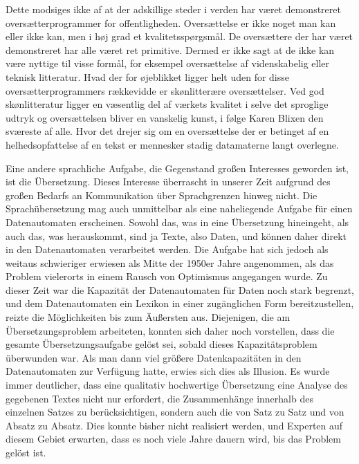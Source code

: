 {Dette modsiges ikke af at der adskillige steder i verden har været demonstreret oversætterprogrammer for offentligheden. Oversættelse er ikke noget man kan eller ikke kan, men i høj grad et kvalitetsspørgsmål. De oversættere der har været demonstreret har alle været ret primitive. Dermed er ikke sagt at de ikke kan være nyttige til visse formål, for eksempel oversættelse af videnskabelig eller teknisk litteratur. Hvad der for øjeblikket ligger helt uden for disse oversætterprogrammers rækkevidde er skønlitterære oversættelser. Ved god skønlitteratur ligger en væsentlig del af værkets kvalitet i selve det sproglige udtryk og oversættelsen bliver en vanskelig kunst, i følge Karen Blixen den sværeste af alle. Hvor det drejer sig om en oversættelse der er betinget af en helhedsopfattelse af en tekst er mennesker stadig datamaterne langt overlegne. 
}{
Eine andere sprachliche Aufgabe, die Gegenstand großen Interesses geworden ist, ist die Übersetzung. Dieses Interesse überrascht in unserer Zeit aufgrund des großen Bedarfs an Kommunikation über Sprachgrenzen hinweg nicht. Die Sprachübersetzung mag auch unmittelbar als eine naheliegende Aufgabe für einen Datenautomaten erscheinen. Sowohl das, was in eine Übersetzung hineingeht, als auch das, was herauskommt, sind ja Texte, also Daten, und können daher direkt in den Datenautomaten verarbeitet werden. Die Aufgabe hat sich jedoch als weitaus schwieriger erwiesen als Mitte der 1950er Jahre angenommen, als das Problem vielerorts in einem Rausch von Optimismus angegangen wurde. Zu dieser Zeit war die Kapazität der Datenautomaten für Daten noch stark begrenzt, und dem Datenautomaten ein Lexikon in einer zugänglichen Form bereitzustellen, reizte die Möglichkeiten bis zum Äußersten aus. Diejenigen, die am Übersetzungsproblem arbeiteten, konnten sich daher noch vorstellen, dass die gesamte Übersetzungsaufgabe gelöst sei, sobald dieses Kapazitätsproblem überwunden war. Als man dann viel größere Datenkapazitäten in den Datenautomaten zur Verfügung hatte, erwies sich dies als Illusion. Es wurde immer deutlicher, dass eine qualitativ hochwertige Übersetzung eine Analyse des gegebenen Textes nicht nur erfordert, die Zusammenhänge innerhalb des einzelnen Satzes zu berücksichtigen, sondern auch die von Satz zu Satz und von Absatz zu Absatz. Dies konnte bisher nicht realisiert werden, und Experten auf diesem Gebiet erwarten, dass es noch viele Jahre dauern wird, bis das Problem gelöst ist.

}
